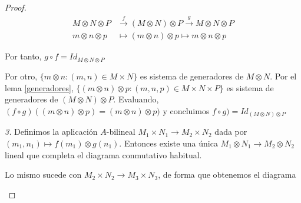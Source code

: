 \documentclass[../main.tex]{subfiles}
\begin{document}
\begin{proof}
\begin{align*}
  M\otimes N \otimes P &\overset{f}{\longrightarrow}(M\otimes N )\otimes P \overset{g}{\longrightarrow}M\otimes N \otimes P\\
  m\otimes n\otimes p &\longmapsto (m\otimes n)\otimes p \longmapsto m\otimes n\otimes p
\end{align*}

Por tanto, $g\circ f=Id_{M\otimes N\otimes P}$

Por otro, $\{m\otimes n:(m,n)\in M\times N\}$ es sistema de generadores de $M\otimes N$. Por el lema \ref{generadores}, $\{(m\otimes n)\otimes p: (m,n,p)\in M\times N\times P\}$ es sistema de generadores de $(M\otimes N)\otimes P$. Evaluando, $(f\circ g)((m\otimes n)\otimes p)=(m\otimes n)\otimes p)$ y concluimos $f\circ g)=Id_{(M\otimes N)\otimes P}$

\textit{3.} Definimos la aplicación $A$-bilineal $M_1\times N_1 \to M_2\times N_2$ dada por $(m_1,n_1) \mapsto f(m_1)\otimes g(n_1)$. Entonces existe una única $M_1\otimes N_1 \to M_2 \otimes N_2$ lineal que completa el diagrama conmutativo habitual.

Lo mismo sucede con $M_2\times N_2 \to M_3\times N_3$, de forma que obtenemos el diagrama

\begin{figure}[h!]
  \centering



  \begin{tikzpicture}[x=0.75pt,y=0.75pt,yscale=-1,xscale=1]



\end{tikzpicture}
\end{figure}
\end{proof}
\end{document}
